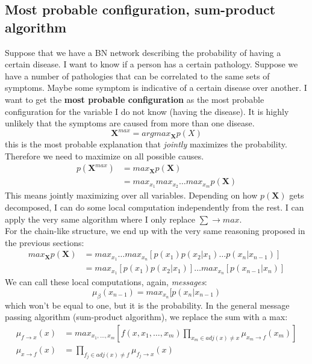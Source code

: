     \subsection{Most probable configuration, sum-product algorithm}
        Suppose that we have a BN network describing the probability of having a certain disease. I want to know if a person has a certain pathology. Suppose we have a number of pathologies that can be correlated to the same sets of symptoms. Maybe some symptom is indicative of a certain disease over another.
        I want to get the \textbf{most probable configuration} as the most probable configuration for the variable I do not know (having the disease). It is highly unlikely that the symptoms are caused from more than one disease.
        $$\textbf{X}^{max} = argmax _{\textbf{X}} p(X)$$
        this is the most probable explanation that \textit{jointly} maximizes the probability.
        Therefore we need to maximize on all possible causes.
        \begin{align*}
            p(\textbf{X}^{max}) &= max_{\textbf{X}} p(\textbf{X})\\
            &= max_{x_1} max_{x_2} \dots max_{x_m} p(\textbf{X})
        \end{align*}
        This means jointly maximizing over all variables. Depending on how $p(\textbf{X})$ gets decomposed, I can do some local computation independently from the rest. 
        I can apply the very same algorithm where I only replace $\sum \rightarrow max$.\\
        For the chain-like structure, we end up with the very same reasoning proposed in the previous sections:
        \begin{align*}
            max_{\textbf{X}} p(\textbf{X}) &= max_{x_1}\dots max_{x_n} [p(x_1)p(x_2|x_1)\dots p(x_n|x_{n-1})]\\
            &= max_{x_1}[p(x_1)p(x_2|x_1)]\dots max_{x_n}[p(x_{n-1}|x_n)]
        \end{align*}
        We can call these local computations, again, \textit{messages}:
        $$\mu_\beta (x_{n-1}) = max_{x_n}[p(x_n|x_{n-1})$$
        which won't be equal to one, but it is the probability.
        In the general message passing algorithm (sum-product algorithm), we replace the sum with a max:
        \begin{align*}
            \mu_{f \rightarrow x} (x) &= max_{x_1, \dots, x_m} \left[ f(x, x_1, \dots, x_m) \prod _{x_m \in adj(x) \neq x} \mu_{x_m \rightarrow f}(x_m) \right]\\
            \mu_{x \rightarrow f} (x) &= \prod_{f_j \in adj(x) \neq f} \mu_{f_j \rightarrow x}(x)
        \end{align*}
        
